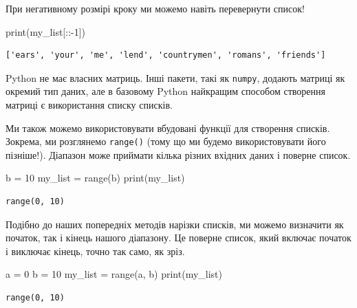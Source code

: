 \documentclass[
  letterpaper,
]{report}
\newenvironment{Shaded}{\begin{snugshade}}{\end{snugshade}}
\newcommand{\BuiltInTok}[1]{\textcolor[rgb]{0.00,0.23,0.31}{#1}}
\newcommand{\DecValTok}[1]{\textcolor[rgb]{0.68,0.00,0.00}{#1}}
\newcommand{\NormalTok}[1]{\textcolor[rgb]{0.00,0.23,0.31}{#1}}
\newcommand{\OperatorTok}[1]{\textcolor[rgb]{0.37,0.37,0.37}{#1}}
\begin{document}
При негативному розмірі кроку ми можемо навіть перевернути список!

\begin{Shaded}
\begin{Highlighting}[]
\BuiltInTok{print}\NormalTok{(my\_list[::}\OperatorTok{{-}}\DecValTok{1}\NormalTok{])}
\end{Highlighting}
\end{Shaded}

\begin{verbatim}
['ears', 'your', 'me', 'lend', 'countrymen', 'romans', 'friends']
\end{verbatim}

Python не має власних матриць. Інші пакети, такі як \texttt{numpy},
додають матриці як окремий тип даних, але в базовому Python найкращим
способом створення матриці є використання списку списків.

Ми також можемо використовувати вбудовані функції для створення списків.
Зокрема, ми розглянемо \texttt{range()} (тому що ми будемо
використовувати його пізніше!). Діапазон може приймати кілька різних
вхідних даних і поверне список.

\begin{Shaded}
\begin{Highlighting}[]
\NormalTok{b }\OperatorTok{=} \DecValTok{10}
\NormalTok{my\_list }\OperatorTok{=} \BuiltInTok{range}\NormalTok{(b)}
\BuiltInTok{print}\NormalTok{(my\_list)}
\end{Highlighting}
\end{Shaded}

\begin{verbatim}
range(0, 10)
\end{verbatim}

Подібно до наших попередніх методів нарізки списків, ми можемо визначити
як початок, так і кінець нашого діапазону. Це поверне список, який
включає початок і виключає кінець, точно так само, як зріз.

\begin{Shaded}
\begin{Highlighting}[]
\NormalTok{a }\OperatorTok{=} \DecValTok{0}
\NormalTok{b }\OperatorTok{=} \DecValTok{10}
\NormalTok{my\_list }\OperatorTok{=} \BuiltInTok{range}\NormalTok{(a, b)}
\BuiltInTok{print}\NormalTok{(my\_list)}
\end{Highlighting}
\end{Shaded}

\begin{verbatim}
range(0, 10)
\end{verbatim}
\end{document}
